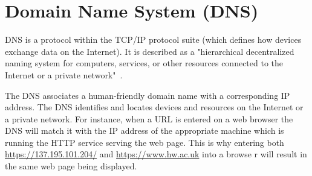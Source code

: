 \chapter{Domain Name System (DNS)}

DNS is a protocol within the TCP/IP protocol suite (which defines how
devices exchange data on the Internet). It is described as a "hierarchical
decentralized naming system for computers, services, or other resources
connected to the Internet or a private
network"~\cite{dnswiki}.

The DNS associates a human-friendly domain name with a corresponding IP
address. The DNS identifies and locates devices and resources on the Internet
or a private network. For instance, when a URL is entered on a web browser the
DNS will match it with the IP address of the appropriate machine which is
running the HTTP service serving the web page. This is why entering both
\url{https://137.195.101.204/} and \url{https://www.hw.ac.uk} into a browse
r will result in the same web page being displayed.